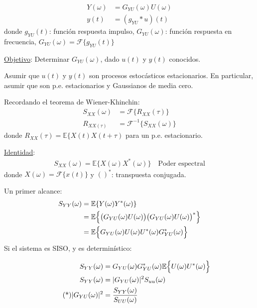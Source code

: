 \begin{align*}
    Y(\omega) &= G_{YU}(\omega)U(\omega)\\
    y(t) &= (g_{YU} \ast u)(t)
\end{align*}
donde $g_{YU}(t)$: función respuesta impulso, $G_{YU}(\omega)$: función respuesta en frecuencia, $G_{YU}(\omega)=\mathcal{F}\{g_{YU}(t)\}$\\

\par \underline{Objetivo}: Determinar $G_{YU}(\omega)$, dado $u(t)$ y $y(t)$ conocidos.\\
\par Asumir que $u(t)$ y $y(t)$ son procesos estocásticos estacionarios. En particular, asumir que son p.e. estacionarios y Gaussianos de media cero.\\
\par Recordando el teorema de Wiener-Khinchin:
\begin{align*}
    S_{XX}(\omega) &= \mathcal{F}\{R_{XX}(\tau)\}\\
    R_{XX(\tau)} &= \mathcal{F}^{-1}\{S_{XX}(\omega)\}
\end{align*}
donde $R_{XX}(\tau) =\mathbb{E}\{X(t)X(t+\tau)$ para  un p.e. estacionario.\\
\par \underline{Identidad}:
\begin{align*}
    S_{XX}(\omega) = \mathbb{E}\{X(\omega)X^\ast(\omega)\} \quad \text{Poder espectral}
\end{align*}
donde $X(\omega)=\mathcal{F}\{x(t)\}$ y $()^\ast$: transpuesta conjugada.\\
\par Un primer alcance:
\begin{align*}
    S_{YY}(\omega) &= \mathbb{E}\{Y(\omega)Y^\ast (\omega)\}\\
    &= \mathbb{E}\Bigl\{\bigl(G_{YU}(\omega)U(\omega)\bigr)\bigl(G_{YU}(\omega)U(\omega)\bigr)^\ast\Bigr\}\\
    &= \mathbb{E}\Bigl\{G_{YU}(\omega)U(\omega)U^\ast(\omega)G^\ast_{YU}(\omega) \Bigr\}
\end{align*}
Si el sistema es SISO, y es determinístico:

\begin{align*}
    S_{YY}(\omega) &= G_{YU}(\omega)G^\ast_{YU}(\omega)\mathbb{E}\Bigl\{U(\omega)U^\ast(\omega) \Bigr\}\\
    S_{YY}(\omega) &= |G_{YU}(\omega)|^2 S_{uu}(\omega)\\
    \tag{*}
    |G_{YU}(\omega)|^2 &= \frac{S_{YY}(\omega)}{S_{UU}(\omega)}
    \label{eq:GYU}
\end{align*}

